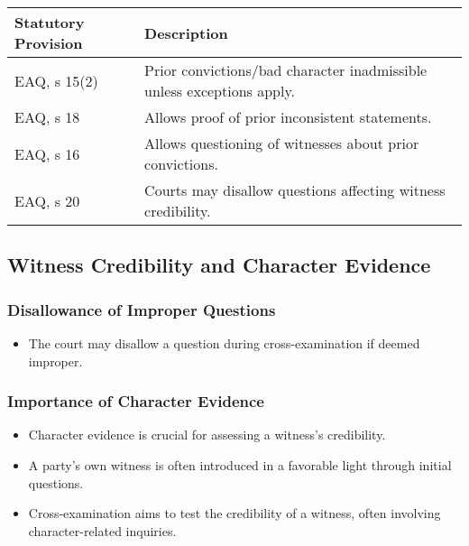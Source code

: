 \begin{longtable}[]{@{}
  >{\raggedright\arraybackslash}p{}
  >{\raggedright\arraybackslash}p{}@{}}
\toprule\noalign{}
\begin{minipage}[b]{\linewidth}\raggedright
Statutory Provision
\end{minipage} & \begin{minipage}[b]{\linewidth}\raggedright
Description
\end{minipage} \\
\midrule\noalign{}
\endhead
\bottomrule\noalign{}
\endlastfoot
EAQ, s 15(2) & Prior convictions/bad character inadmissible unless
exceptions apply. \\
EAQ, s 18 & Allows proof of prior inconsistent statements. \\
EAQ, s 16 & Allows questioning of witnesses about prior convictions. \\
EAQ, s 20 & Courts may disallow questions affecting witness
credibility. \\
\end{longtable}

\subsection{  Witness Credibility and Character
Evidence}\label{witness-credibility-and-character-evidence}

\subsubsection{Disallowance of Improper
Questions}\label{disallowance-of-improper-questions}

\begin{itemize}
\tightlist
\item
  The court may disallow a question during cross-examination if deemed
  improper.
\end{itemize}

\subsubsection{Importance of Character
Evidence}\label{importance-of-character-evidence}

\begin{itemize}
\tightlist
\item
  Character evidence is crucial for assessing a witness's credibility.
\item
  A party's own witness is often introduced in a favorable light through
  initial questions.
\item
  Cross-examination aims to test the credibility of a witness, often
  involving character-related inquiries.
\end{itemize}

